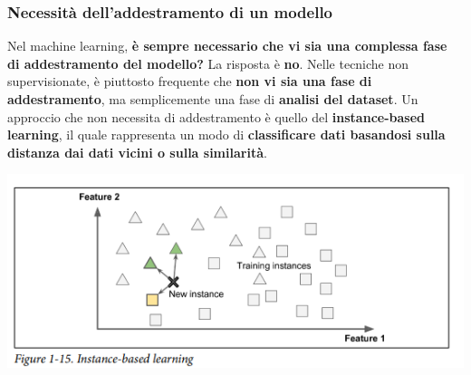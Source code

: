 \documentclass[12pt]{article}
\begin{document}
\subsubsection{Necessità dell'addestramento di un modello}
Nel machine learning, \textbf{è sempre necessario che vi sia una complessa fase di addestramento del modello?}
La risposta è \textbf{no}. Nelle tecniche non supervisionate, è piuttosto frequente che \textbf{non vi sia una fase di addestramento}, ma semplicemente una fase di \textbf{analisi del dataset}.
Un approccio che non necessita di addestramento è quello del \textbf{instance-based learning}, il quale rappresenta un modo di \textbf{classificare dati basandosi sulla distanza dai dati vicini o sulla similarità}.
\begin{center}
    \includegraphics[width =0.75\linewidth]{Images/65.PNG}
\end{center}
\end{document}

